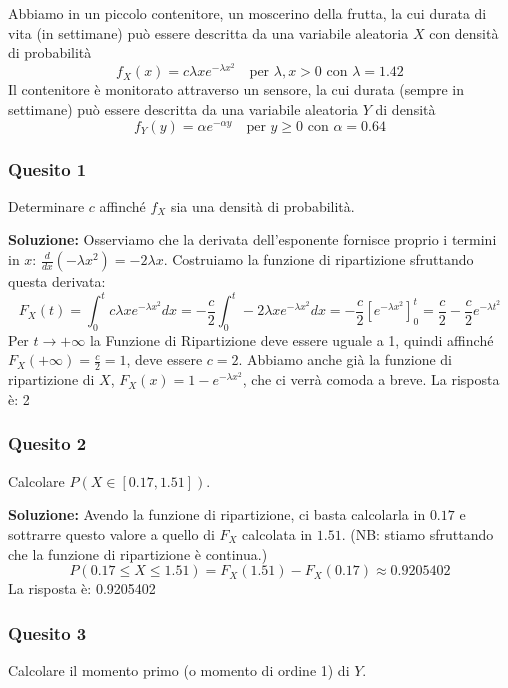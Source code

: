 \documentclass[12pt, a4paper]{article}
\begin{document}
\vspace{0.5cm}
\begin{tcolorbox}[colback=lightergray!10, colframe=tocsec, title=\textbf{Esercizio 3}]
Abbiamo in un piccolo contenitore, un moscerino della frutta, la cui durata di vita (in settimane) può essere descritta da una variabile aleatoria $X$ con densità di probabilità 
$$ f_X(x)=c \lambda x e^{-\lambda x^2} \quad \text{per } \lambda, x > 0 \text{ con } \lambda=1.42 $$
Il contenitore è monitorato attraverso un sensore, la cui durata (sempre in settimane) può essere descritta da una variabile aleatoria $Y$ di densità 
$$ f_Y(y)=\alpha e^{-\alpha y} \quad \text{per } y \geq 0 \text{ con } \alpha=0.64 $$
\end{tcolorbox}

\subsubsection*{Quesito 1}
Determinare $c$ affinché $f_X$ sia una densità di probabilità.

\textbf{Soluzione:}
Osserviamo che la derivata dell'esponente fornisce proprio i termini in $x$: $\frac{d}{dx}(-\lambda x^2) = -2\lambda x$.
Costruiamo la funzione di ripartizione sfruttando questa derivata:
$$ F_X(t) = \int_0^t c \lambda x e^{-\lambda x^2} dx = -\frac{c}{2} \int_0^t -2\lambda x e^{-\lambda x^2} dx = -\frac{c}{2} \left[ e^{-\lambda x^2} \right]_0^t = \frac{c}{2} - \frac{c}{2} e^{-\lambda t^2} $$
Per $t \to +\infty$ la Funzione di Ripartizione deve essere uguale a 1, quindi affinché $F_X(+\infty) = \frac{c}{2} = 1$, deve essere $c=2$. 
Abbiamo anche già la funzione di ripartizione di $X$, $F_X(x) = 1 - e^{-\lambda x^2}$, che ci verrà comoda a breve.
La risposta è: 2

\subsubsection*{Quesito 2}
Calcolare $P(X \in [0.17, 1.51])$.

\textbf{Soluzione:}
Avendo la funzione di ripartizione, ci basta calcolarla in $0.17$ e sottrarre questo valore a quello di $F_X$ calcolata in $1.51$. (NB: stiamo sfruttando che la funzione di ripartizione è continua.)
$$ P(0.17 \leq X \leq 1.51) = F_X(1.51) - F_X(0.17) \approx 0.9205402 $$
La risposta è: 0.9205402

\subsubsection*{Quesito 3}
Calcolare il momento primo (o momento di ordine 1) di $Y$.
\end{document}
